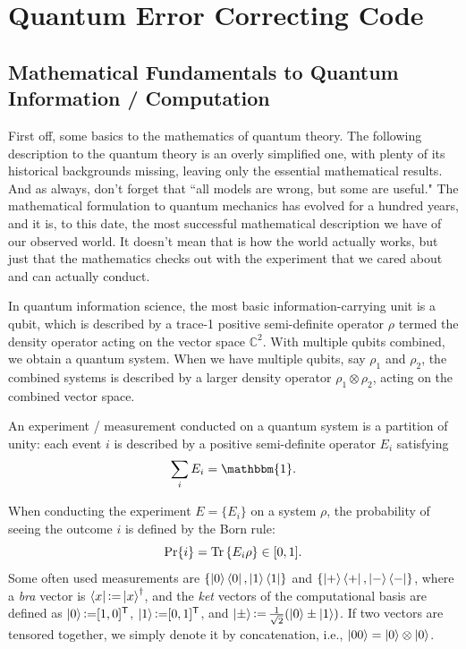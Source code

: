 \section{Quantum Error Correcting Code}

\subsection{Mathematical Fundamentals to Quantum Information / Computation}
First off, some basics to the mathematics of quantum theory. The following description to the quantum theory is an overly simplified one, with plenty of its historical backgrounds missing, leaving only the essential mathematical results. And as always, don't forget that ``all models are wrong, but some are useful." The mathematical formulation to quantum mechanics has evolved for a hundred years, and it is, to this date, the most successful mathematical description we have of our observed world. It doesn't mean that is how the world actually works, but just that the mathematics checks out with the experiment that we cared about and can actually conduct.

In quantum information science, the most basic information-carrying unit is a qubit, which is described by a trace-1 positive semi-definite operator $\rho$ termed the density operator acting on the vector space $\mathbb{C}^2$. With multiple qubits combined, we obtain a quantum system. When we have multiple qubits, say $\rho_1$ and $\rho_2$, the combined systems is described by a larger density operator $\rho_1\otimes\rho_2$, acting on the combined vector space.

An experiment / measurement conducted on a quantum system is a partition of unity: each event $i$ is described by a positive semi-definite operator $E_i$ satisfying
\begin{equation}
    \sum_i E_i = \mathbbm{1}.
\end{equation}

When conducting the experiment $E=\{E_i\}$ on a system $\rho$, the probability of seeing the outcome $i$ is defined by the Born rule:
\begin{equation}
    \mathrm{Pr}\{i\} = \mathrm{Tr}\left\{{E_i\rho}\right\} \in [0,1].
\end{equation}
Some often used measurements are $\{\left|{0}\right\rangle\left\langle{0}\right|,\left|{1}\right\rangle\left\langle{1}\right|\}$ and $\{\left|{+}\right\rangle\left\langle{+}\right|,\left|{-}\right\rangle\left\langle{-}\right|\}$, where a \textit{bra} vector is $\left\langle{x}\right| \operatorname{\vcentcolon=} \left|{x}\right\rangle^\dagger$, and the \textit{ket} vectors of the computational basis are defined as $\left|{0}\right\rangle \operatorname{\vcentcolon=} [1,0]^{\mathsf{T}}$, $\left|{1}\right\rangle \operatorname{\vcentcolon=} [0,1]^{\mathsf{T}}$, and $\left|{\pm}\right\rangle \operatorname{\vcentcolon=} \frac{1}{\sqrt{2}}(\left|{0}\right\rangle \pm \left|{1}\right\rangle)$. If two vectors are tensored together, we simply denote it by concatenation, i.e., $\left|{00}\right\rangle=\left|{0}\right\rangle\otimes\left|{0}\right\rangle$.

